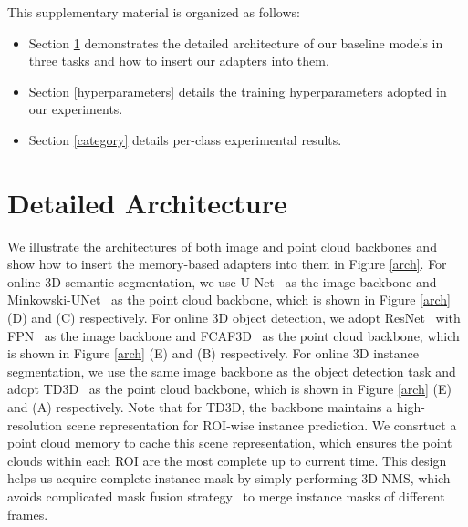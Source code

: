 \noindent This supplementary material is organized as follows: 
\begin{itemize}
    \item Section \ref{architecture} demonstrates the detailed architecture of our baseline models in three tasks and how to insert our adapters into them.
    \item Section \ref{hyperparameters} details the training hyperparameters adopted in our experiments. 
    \item Section \ref{category} details per-class experimental results. 
\end{itemize}


\section{Detailed Architecture}\label{architecture}
We illustrate the architectures of both image and point cloud backbones and show how to insert the memory-based adapters into them in Figure \ref{arch}.
For online 3D semantic segmentation, we use U-Net~\cite{ronneberger2015u} as the image backbone and Minkowski-UNet~\cite{choy20194d} as the point cloud backbone, which is shown in Figure \ref{arch} (D) and (C) respectively.
For online 3D object detection, we adopt ResNet~\cite{he2016deep} with FPN~\cite{lin2017fpn} as the image backbone and FCAF3D~\cite{rukhovich2022fcaf3d} as the point cloud backbone, which is shown in Figure \ref{arch} (E) and (B) respectively.
For online 3D instance segmentation, we use the same image backbone as the object detection task and adopt TD3D~\cite{kolodiazhnyi2023top} as the point cloud backbone, which is shown in Figure \ref{arch} (E) and (A) respectively.
Note that for TD3D, the backbone maintains a high-resolution scene representation for ROI-wise instance prediction. We consrtuct a point cloud memory to cache this scene representation, which ensures the point clouds within each ROI are the most complete up to current time. This design helps us acquire complete instance mask by simply performing 3D NMS, which avoids complicated mask fusion strategy~\cite{liu2022ins} to merge instance masks of different frames.


